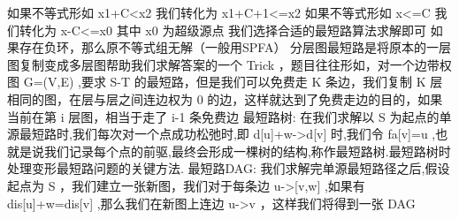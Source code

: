 {}如果不等式形如\markdownRendererDollarSign{} x1+C<x2 \markdownRendererDollarSign{} 我们转化为\markdownRendererDollarSign{} x1+C+1<=x2 \markdownRendererDollarSign{}\markdownRendererParagraphSeparator
{}如果不等式形如\markdownRendererDollarSign{} x<=C \markdownRendererDollarSign{} 我们转化为\markdownRendererDollarSign{} x-C<=x0\markdownRendererSoftLineBreak
{}\markdownRendererDollarSign{}其中\markdownRendererDollarSign{} x0 \markdownRendererDollarSign{}为超级源点\markdownRendererParagraphSeparator
{}我们选择合适的最短路算法求解即可 如果存在负环，那么原不等式组无解（一般用SPFA）\markdownRendererInterblockSeparator
{}
\markdownRendererSectionEnd \markdownRendererSectionBegin
{}\markdownRendererInterblockSeparator
{}分层图最短路是将原本的一层图复制变成多层图帮助我们求解答案的一个\markdownRendererDollarSign{} Trick \markdownRendererDollarSign{}，题目往往形如，对一个边带权图\markdownRendererDollarSign{} G=(V,E) \markdownRendererDollarSign{},要求\markdownRendererDollarSign{} S-T \markdownRendererDollarSign{}的最短路，但是我们可以免费走\markdownRendererDollarSign{} K \markdownRendererDollarSign{}条边，我们复制\markdownRendererDollarSign{} K \markdownRendererDollarSign{}层相同的图，在层与层之间连边权为\markdownRendererDollarSign{} 0 \markdownRendererDollarSign{}的边，这样就达到了免费走边的目的，如果当前在第\markdownRendererDollarSign{} i \markdownRendererDollarSign{}层图，相当于走了\markdownRendererDollarSign{} i-1\markdownRendererSoftLineBreak
{}\markdownRendererDollarSign{}条免费边\markdownRendererInterblockSeparator
{}
\markdownRendererSectionEnd \markdownRendererSectionBegin
{}\markdownRendererInterblockSeparator
{}最短路树:\markdownRendererParagraphSeparator
{}在我们求解以\markdownRendererDollarSign{} S \markdownRendererDollarSign{}为起点的单源最短路时,我们每次对一个点成功松弛时,即\markdownRendererDollarSign{} d[u]+w->d[v] \markdownRendererDollarSign{}时,我们令\markdownRendererDollarSign{} fa[v]=u \markdownRendererDollarSign{},也就是说我们记录每个点的前驱,最终会形成一棵树的结构,称作最短路树.最短路树时处理变形最短路问题的关键方法.\markdownRendererParagraphSeparator
{}最短路DAG:\markdownRendererParagraphSeparator
{}我们求解完单源最短路径之后,假设起点为\markdownRendererDollarSign{} S \markdownRendererDollarSign{}，我们建立一张新图，我们对于每条边\markdownRendererDollarSign{} u->[v,w] \markdownRendererDollarSign{},如果有\markdownRendererDollarSign{} dis[u]+w=dis[v] \markdownRendererDollarSign{},那么我们在新图上连边\markdownRendererDollarSign{} u->v \markdownRendererDollarSign{}，这样我们将得到一张\markdownRendererDollarSign{} DAG\markdownRendererSoftLineBreak
